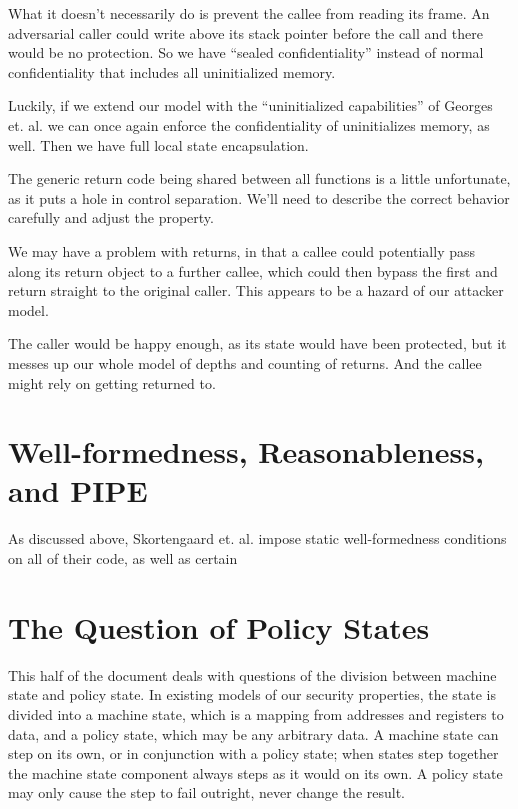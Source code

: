 \documentclass{article}
\begin{document}
What it doesn't necessarily do is prevent the callee from reading its frame. An adversarial
caller could write above its stack pointer before the call and there would be no protection.
So we have ``sealed confidentiality'' instead of normal confidentiality that includes all
uninitialized memory.

Luckily, if we extend our model with the ``uninitialized capabilities'' of Georges et. al.
we can once again enforce the confidentiality of uninitializes memory, as well. Then
we have full local state encapsulation.

The generic return code being shared between all functions is a little unfortunate, as it
puts a hole in control separation. We'll need to describe the correct behavior carefully
and adjust the property.

We may have a problem with returns, in that a callee could potentially pass along its
return object to a further callee, which could then bypass the first and return straight
to the original caller. This appears to be a hazard of our attacker model.

The caller would be happy enough, as its state would have been protected,
but it messes up our whole model of depths and counting
of returns. And the callee might rely on getting returned to.

\section{Well-formedness, Reasonableness, and PIPE}

As discussed above, Skortengaard et. al. impose static well-formedness conditions on
all of their code, as well as certain 

\section{The Question of Policy States}

This half of the document deals with questions of the division between machine state and
policy state. In existing models of our security properties, the state is divided into a
machine state, which is a mapping from addresses and registers to data, and a policy state,
which may be any arbitrary data. A machine state can step on its own, or in conjunction
with a policy state; when states step together the machine state component always steps
as it would on its own. A policy state may only cause the step to fail outright, never
change the result.
\end{document}
